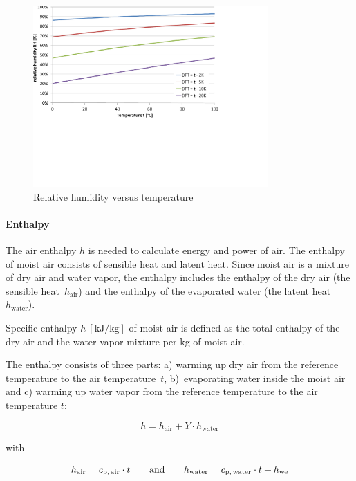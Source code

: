\documentclass[11pt,a4paper,english,twoside]{scrreprt}
\begin{document}
\begin{figure}
  \centering
  \includegraphics*[width=0.8\textwidth,angle=0]{FCF_Diag_DPT2.pdf}
  \caption[Relative humidity versus temperature]{Relative humidity versus temperature}
\end{figure}


\paragraph{Enthalpy}

The air enthalpy $h$ is needed to calculate energy and power of air. The enthalpy of moist air consists of sensible heat and latent heat. Since moist air is a mixture of dry air and water vapor, the enthalpy includes the enthalpy of the dry air (the sensible heat~$h_\text{air}$) and the enthalpy of the evaporated water (the latent heat~$h_\text{water}$).

Specific enthalpy $h\ [\text{kJ/kg}]$ of moist air is defined as the total enthalpy of the dry air and the water vapor mixture per kg of moist air.

The enthalpy consists of three parts: a) warming up dry air from the reference temperature to the air temperature~$t$, b)~evaporating water inside the moist air and c) warming up water vapor from the reference temperature to the air temperature $t$:

\begin{equation}
  \label{eqn:air_enthalpy} h=h_\text{air} +Y\cdot h_\text{water}
\end{equation}

with

\[h_\text{air} =c_\text{p,\,air} \cdot t \qquad \mbox{and} \qquad
 h_\text{water} =c_\text{p,\,water} \cdot t+h_\text{we} \]
\end{document}
